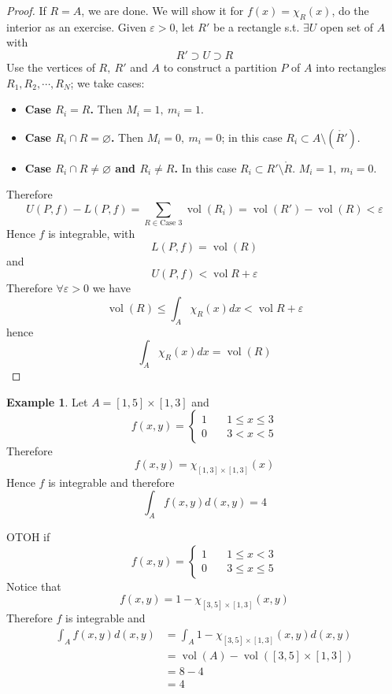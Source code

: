 \documentclass[11pt,a4paper]{article}
\theoremstyle{definition}
\newtheorem{example}[definition]{Example}
\theoremstyle{plain}
\theoremstyle{remark}
\newcommand{\vol}{\operatorname{vol}}
\begin{document}
\begin{proof}
    If $R = A$, we are done. 
    We will show it for $f(x) = \chi_R(x)$, do the interior as an exercise. 
    Given $\varepsilon > 0$, let $R'$ be a rectangle s.t. $\exists U$ open set of $A$ with 
    $$R' \supset U \supset R$$
    Use the vertices of $R, \ R'$ and $A$ to construct a partition $P$ of $A$ into rectangles 
    $R_1, R_2, \cdots, R_N$; we take cases: 
    \begin{itemize}
        \item \textbf{Case $R_i = R$.} Then $M_i = 1, \ m_i = 1$. 
        \item \textbf{Case $R_i \cap R = \varnothing$.} Then $M_i = 0, \ m_i = 0$; in this case
        $R_i \subset A \setminus (\mathring{R'})$. 
        \item \textbf{Case $R_i \cap R \ne \varnothing$ and $R_i \ne R$.} In this case $R_i \subset R' \setminus \mathring{R}$. 
        $M_i = 1, \ m_i = 0$. 
    \end{itemize}
    Therefore 
    $$U(P,f) - L(P,f) = \sum_{R \in \text{Case } 3} \vol (R_i) = \vol (R') - \vol (R) < \varepsilon$$
    Hence $f$ is integrable, with 
    $$L(P,f) = \vol (R)$$
    and 
    $$U(P,f) < \vol R + \varepsilon$$
    Therefore $\forall \varepsilon > 0$ we have 
    $$\vol (R) \le \int_A \chi_R(x) dx < \vol R + \varepsilon$$
    hence 
    $$\int_A \chi_R (x) dx = \vol (R)$$
\end{proof}

\begin{example}
    Let $A = [1, 5] \times [1,3]$ and 
    $$f(x,y) = \begin{cases}
        1 \quad & 1 \le x \le 3 \\
        0 \quad & 3 < x < 5
    \end{cases}$$
    Therefore 
    $$f(x,y) = \chi_{[1,3]\times [1,3]} (x)$$
    Hence $f$ is integrable and therefore 
    $$\int_A f(x,y) d(x,y) = 4$$

    OTOH if 
    $$f(x,y) = \begin{cases}
        1 \quad & 1 \le x < 3 \\
        0 \quad & 3 \le x \le 5
    \end{cases}$$
    Notice that 
    $$f(x,y) = 1 - \chi_{[3,5] \times [1,3]} (x,y)$$
    Therefore $f$ is integrable and 
    \begin{align*}
        \int_A f(x,y) d(x,y) &= \int_A 1 - \chi_{[3,5] \times [1,3]} (x,y) d(x,y) \\
        &=\vol (A) - \vol ([3,5] \times [1,3]) \\
        &= 8 - 4 \\
        &= 4
    \end{align*}
\end{example}
\end{document}
